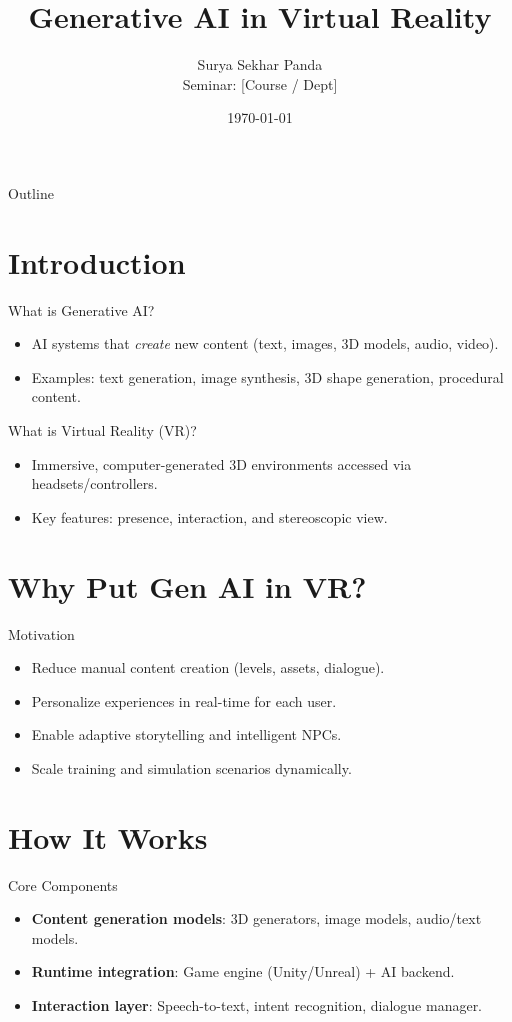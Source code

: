 \documentclass[11pt]{beamer}
\title[Gen AI in VR]{Generative AI in Virtual Reality}
\author{Surya Sekhar Panda \\ Seminar: [Course / Dept]}
\institute{Sambalpur University Institute of Information and Technology}
\date{\today}
\begin{document}
\begin{frame}
  \titlepage
\end{frame}

\begin{frame}{Outline}
  \tableofcontents
\end{frame}

\section{Introduction}
\begin{frame}{What is Generative AI?}
  \begin{itemize}
    \item AI systems that \emph{create} new content (text, images, 3D models, audio, video).
    \item Examples: text generation, image synthesis, 3D shape generation, procedural content.
  \end{itemize}
\end{frame}

\begin{frame}{What is Virtual Reality (VR)?}
  \begin{itemize}
    \item Immersive, computer-generated 3D environments accessed via headsets/controllers.
    \item Key features: presence, interaction, and stereoscopic view.
  \end{itemize}
\end{frame}

\section{Why Put Gen AI in VR?}
\begin{frame}{Motivation}
  \begin{itemize}
    \item Reduce manual content creation (levels, assets, dialogue).
    \item Personalize experiences in real-time for each user.
    \item Enable adaptive storytelling and intelligent NPCs.
    \item Scale training and simulation scenarios dynamically.
  \end{itemize}
\end{frame}

\section{How It Works}
\begin{frame}{Core Components}
  \begin{itemize}
    \item \textbf{Content generation models}: 3D generators, image models, audio/text models.
    \item \textbf{Runtime integration}: Game engine (Unity/Unreal) + AI backend.
    \item \textbf{Interaction layer}: Speech-to-text, intent recognition, dialogue manager.
  \end{itemize}
\end{frame}
\end{document}
